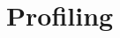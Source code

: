 \documentclass[12pt,twoside,notitlepage]{report}
\begin{document}
%
%

%
%

%
%

\section{Profiling}
\label{sec:profiling}
%
%

%
%

%
%

%
%

%
%
\end{document}
